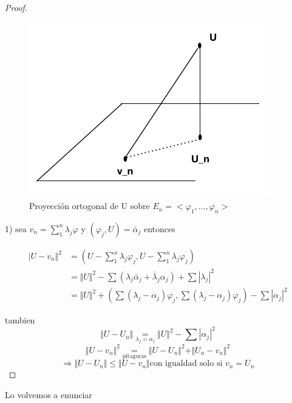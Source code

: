 \documentclass[a4paper,10pt]{book}
\begin{document}
\begin{proof}

\begin{figure}
    \centering
    \includegraphics[width=0.5\linewidth]{Fig_2.png}
    \caption{Proyección ortogonal de U sobre $E_n= < \varphi_1, \ldots, \varphi_n >$ }
    \label{fig:2}
\end{figure}

    1)  sea $v_n = \sum\limits_1^n \lambda_j\varphi $ y $(\varphi_j,U) = \bar{\alpha}_j$
    entonces 
    
    \begin{align*}
    \vert U - v_n\Vert^2  &= ( U - \sum\limits_1^n \lambda_j\varphi_j , U - \sum\limits_1^n\lambda_j \varphi_j) \\    
    &= \Vert U \Vert^2 - \sum (\lambda_j \bar{\alpha}_j +\bar{\lambda}_j \alpha_j) +\sum|\lambda_j |^2\\
    &= \Vert U\Vert ^2  + (\sum (\lambda_j-\alpha_j) \varphi_j, \sum (\lambda_j-\alpha_j ) \varphi_j) - \sum |\alpha_j|^2
    \end{align*}

    tambien 
    \[
    \Vert U- U_n \Vert  \underset{\lambda_j = \alpha_j}{ =}  \Vert U\Vert^2 -\sum |\alpha_j|^2 
    \]
    \[
    \Vert U -v_n \Vert^2 \underset{\text{pitagoras}}{=} \Vert U - U_n\Vert^2 + \Vert U_n -v_n\Vert ^2  
    \]
    \[
    \Rightarrow \Vert U -U_n\Vert \leq \Vert U -v_n \Vert \text{con igualdad solo si  } v_n=U_n
    \]
    
\end{proof}

Lo volvemos a enunciar
\end{document}
